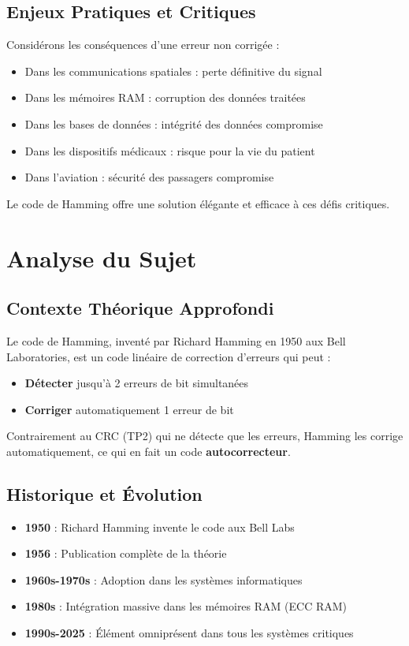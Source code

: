\documentclass[12pt, a4paper]{article}
\begin{document}
\subsection{Enjeux Pratiques et Critiques}

Considérons les conséquences d'une erreur non corrigée :
\begin{itemize}
    \item Dans les communications spatiales : perte définitive du signal
    \item Dans les mémoires RAM : corruption des données traitées
    \item Dans les bases de données : intégrité des données compromise
    \item Dans les dispositifs médicaux : risque pour la vie du patient
    \item Dans l'aviation : sécurité des passagers compromise
\end{itemize}

Le code de Hamming offre une solution élégante et efficace à ces défis critiques.

\section{Analyse du Sujet}

\subsection{Contexte Théorique Approfondi}

Le code de Hamming, inventé par Richard Hamming en 1950 aux Bell Laboratories, est un code linéaire de correction d'erreurs qui peut :

\begin{itemize}
    \item \textbf{Détecter} jusqu'à 2 erreurs de bit simultanées
    \item \textbf{Corriger} automatiquement 1 erreur de bit
\end{itemize}

Contrairement au CRC (TP2) qui ne détecte que les erreurs, Hamming les corrige automatiquement, ce qui en fait un code \textbf{autocorrecteur}.

\subsection{Historique et Évolution}

\begin{itemize}
    \item \textbf{1950} : Richard Hamming invente le code aux Bell Labs
    \item \textbf{1956} : Publication complète de la théorie
    \item \textbf{1960s-1970s} : Adoption dans les systèmes informatiques
    \item \textbf{1980s} : Intégration massive dans les mémoires RAM (ECC RAM)
    \item \textbf{1990s-2025} : Élément omniprésent dans tous les systèmes critiques
\end{itemize}
\end{document}
